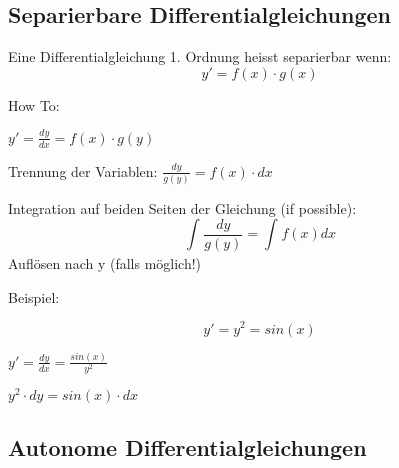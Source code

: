 \begin{multicols*}{3}
\subsection{Separierbare Differentialgleichungen}
{Eine Differentialgleichung 1. Ordnung heisst separierbar wenn:}
$$ y' = f(x)\cdot g(x)$$

{How To:}

 $y' = \frac{dy}{dx} = f(x)\cdot g(y) $

 {Trennung der Variablen:} $\frac{dy}{g(y)} = f(x)\cdot dx$

 {Integration auf beiden Seiten der Gleichung (if possible):} $$\int_{}^{}{\frac{dy}{g(y)}=\int_{}^{}f(x)dx}$$
 {Auflösen nach y (falls möglich!)}

\begin{multicols}{2}
{Beispiel:}

$$y' = y^2 = sin(x)$$

 $y' = \frac{dy}{dx}=\frac{sin(x)}{y^2}$

 $y^2\cdot dy = sin(x)\cdot dx $
\columnbreak
 


\end{multicols}



\subsection{Autonome Differentialgleichungen}


\WhiteSpace

\mbox{}
	
\end{multicols*} 


